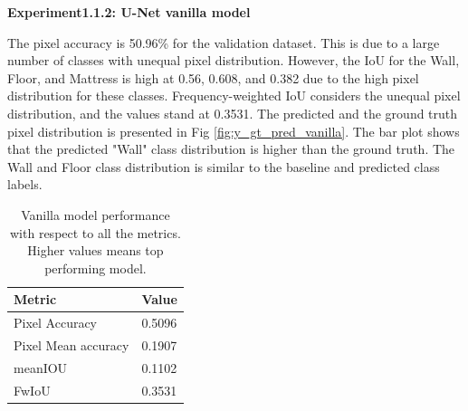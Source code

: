 	{ \bf Experiment1.1.2: U-Net vanilla model}
	
	The pixel accuracy is 50.96\% for the validation dataset. This is due to a large number of classes with unequal pixel distribution. However, the IoU for the Wall, Floor, and Mattress is high at 0.56, 0.608, and 0.382 due to the high pixel distribution for these classes. Frequency-weighted IoU considers the unequal pixel distribution, and the values stand at 0.3531. The predicted and the ground truth pixel distribution is presented in Fig \ref{fig:y_gt_pred_vanilla}. The bar plot shows that the predicted "Wall" class distribution is higher than the ground truth. The Wall and Floor class distribution is similar to the baseline and predicted class labels. 
    
   	
   	\begin{table}
    \begin{center}
    	\begin{tabular}{ | l | p{12cm} |}
    		\hline
    		
    		\cellcolor{purple!30}Metric & \cellcolor{purple!30}Value \\ \hline
    		Pixel Accuracy & 0.5096 \\ \hline
    		Pixel Mean accuracy & 0.1907  \\ \hline
    		meanIOU & 0.1102 \\ \hline
    		FwIoU & 0.3531 \\ \hline
    		\hline
    	\end{tabular}
   		\caption{Vanilla model performance with respect to all the metrics. Higher values means top performing model.}
	    \label{tab:caption}
    \end{center}
	\end{table}
	
